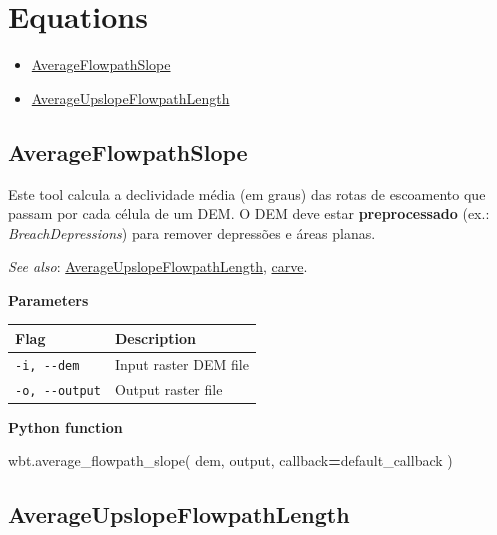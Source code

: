 \documentclass[
]{book}
\newenvironment{Shaded}{\begin{snugshade}}{\end{snugshade}}
\newcommand{\NormalTok}[1]{#1}
\newcommand{\OperatorTok}[1]{\textcolor[rgb]{0.81,0.36,0.00}{\textbf{#1}}}
\providecommand{\tightlist}{%
  \setlength{\itemsep}{0pt}\setlength{\parskip}{0pt}}
\theoremstyle{definition}
\theoremstyle{definition}
\theoremstyle{definition}
\theoremstyle{definition}
\theoremstyle{remark}
\begin{document}
\section{Equations}\label{equations}

\begin{itemize}
\tightlist
\item
  \hyperref[AverageFlowpathSlope]{AverageFlowpathSlope}
\item
  \hyperref[AverageUpslopeFlowpathLength]{AverageUpslopeFlowpathLength}
\end{itemize}

\subsection{AverageFlowpathSlope}\label{AverageFlowpathSlope}

Este tool calcula a declividade média (em graus) das rotas de escoamento que passam por cada célula de um DEM.
O DEM deve estar \textbf{preprocessado} (ex.: \emph{BreachDepressions}) para remover depressões e áreas planas.

\emph{See also}: \hyperref[AverageUpslopeFlowpathLength]{AverageUpslopeFlowpathLength}, \hyperref[carve]{carve}.

\textbf{Parameters}

\begin{longtable}[]{@{}ll@{}}
\toprule\noalign{}
Flag & Description \\
\midrule\noalign{}
\endhead
\bottomrule\noalign{}
\endlastfoot
\texttt{-i,\ -\/-dem} & Input raster DEM file \\
\texttt{-o,\ -\/-output} & Output raster file \\
\end{longtable}

\textbf{Python function}

\begin{Shaded}
\begin{Highlighting}[]
\NormalTok{wbt.average\_flowpath\_slope(}
\NormalTok{    dem,}
\NormalTok{    output,}
\NormalTok{    callback}\OperatorTok{=}\NormalTok{default\_callback}
\NormalTok{)}
\end{Highlighting}
\end{Shaded}

\subsection{AverageUpslopeFlowpathLength}\label{AverageUpslopeFlowpathLength}
\end{document}
